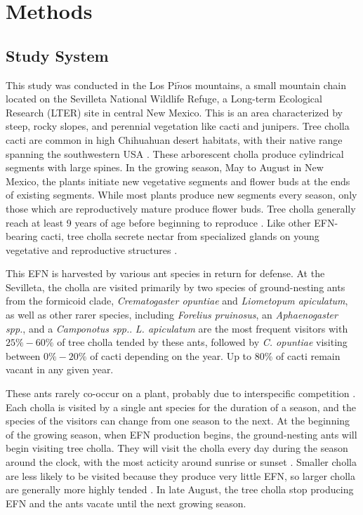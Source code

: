 \documentclass[11pt]{article}
\begin{document}
\section*{Methods}
\subsection*{Study System}
  
This study was conducted in the Los Pi$\tilde{n}$os mountains, a small mountain chain located on the Sevilleta National Wildlife Refuge, a Long-term Ecological Research (LTER) site in central New Mexico.
This is an area characterized by steep, rocky slopes, and perennial vegetation like cacti and junipers. 
Tree cholla cacti are common in high Chihuahuan desert habitats, with their native range spanning the southwestern USA \citep{Benson1982}. 
These arborescent cholla produce cylindrical segments with large spines. 
In the growing season, May to August in New Mexico, the plants initiate new vegetative segments and flower buds at the ends of existing segments. 
While most plants produce new segments every season, only those which are reproductively mature produce flower buds. 
Tree cholla generally reach at least 9 years of age before beginning to reproduce \citep{Ohm2014}.
Like other EFN-bearing cacti, tree cholla secrete nectar from specialized glands on young vegetative and reproductive structures \citep{Ness2006,Oliveira1999}.

This EFN is harvested by various ant species in return for defense. 
At the Sevilleta, the cholla are visited primarily by two species of ground-nesting ants from the formicoid clade, \textit{Crematogaster opuntiae} and \textit{Liometopum apiculatum}, as well as other rarer species, including \textit{Forelius pruinosus}, an \textit{Aphaenogaster spp.}, and a \textit{Camponotus spp.}.
\textit{L. apiculatum} are the most frequent visitors with $25\% - 60\%$ of tree cholla tended by these ants, followed by \textit{C. opuntiae} visiting between $0\% - 20\%$ of cacti \citep{Donald2022} depending on the year. Up to $80\%$ of cacti remain vacant in any given year. 

These ants rarely co-occur on a plant, probably due to interspecific competition \citep{Miller2007}.
Each cholla is visited by a single ant species for the duration of a season, and the species of the visitors can change from one season to the next. 
At the beginning of the growing season, when EFN production begins, the ground-nesting ants will begin visiting tree cholla.
They will visit the cholla every day during the season around the clock, with the most acticity around sunrise or sunset \citep{Ohm2014}. 
Smaller cholla are less likely to be visited because they produce very little EFN, so larger cholla are generally more highly tended \citep{Miller2014}. 
In late August, the tree cholla stop producing EFN and the ants vacate until the next growing season. 
\end{document}
